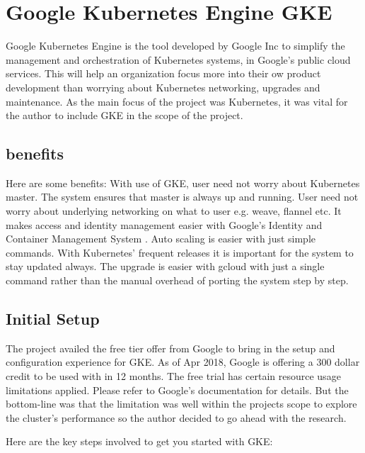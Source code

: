 \section{ Google Kubernetes Engine GKE}

Google Kubernetes Engine is the tool developed by Google Inc to
simplify the management and orchestration of Kubernetes systems, in
Google's public cloud services. This will help an organization focus
more into their ow product development than worrying about Kubernetes
networking, upgrades and maintenance. As the main focus of the project
was Kubernetes, it was vital for the author to include GKE in the
scope of the project.

\subsection{benefits}

Here are some benefits: With use of GKE, user need not worry about
Kubernetes master. The system ensures that master is always up and
running. User need not worry about underlying networking on what to
user e.g. weave, flannel etc.  It makes access and identity management
easier with Google's Identity and Container Management System
\TODO{[IAM]}. Auto scaling is easier with just simple commands. With
Kubernetes' frequent releases it is important for the system to stay
updated always. The upgrade is easier with gcloud with just a single
command rather than the manual overhead of porting the system step by
step.

\subsection{Initial Setup}

The project availed the free tier offer from Google to bring in the
setup and configuration experience for GKE. As of Apr 2018, Google is
offering a 300 dollar credit to be used with in 12 months. The free
trial has certain resource usage limitations applied. Please refer to
Google's documentation for details.  But the bottom-line was that the
limitation was well within the projects scope to explore the cluster's
performance so the author decided to go ahead with the research.

Here are the key steps involved to get you started with GKE:

